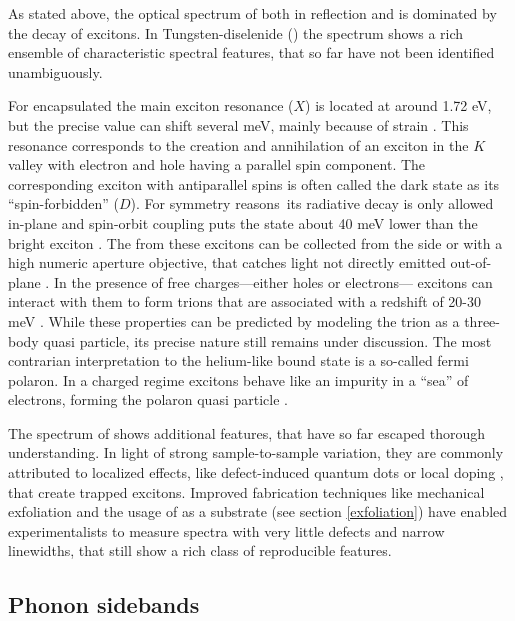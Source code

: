 As stated above, the optical spectrum of \tmds both in reflection and \pl is dominated by the decay of excitons. In Tungsten-diselenide (\wse\!) the \pl spectrum shows a rich ensemble of characteristic spectral features, that so far have not been identified unambiguously. 

For \hbng encapsulated \wse the main exciton resonance ($X$) is located at around 1.72 eV, but the precise value can shift several meV, mainly because of strain \cite{zhu_strain_2013}. This resonance corresponds to the creation and annihilation of an exciton in the $K$ valley with electron and hole having a parallel spin component. The corresponding exciton with antiparallel spins is often called the dark state as its ``spin-forbidden'' ($D$). For symmetry reasons\textregistered\ its radiative decay is only allowed in-plane and spin-orbit coupling puts the state about 40 meV lower than the bright exciton \cite{echeverry_splitting_2016}. The \pl from these excitons can be collected from the side or with a high numeric aperture objective, that catches light not directly emitted out-of-plane \cite{robert_fine_2017, wang_-plane_2017}. In the presence of free charges---either holes or electrons--- excitons can interact with them to form trions that are associated with a redshift of 20-30 meV \cite{courtade_charged_2017}. While these properties can be predicted by modeling the trion as a three-body quasi particle, its precise nature still remains under discussion. The most contrarian interpretation to the helium-like bound state is a so-called fermi polaron. In a charged regime excitons behave like an impurity in a ``sea'' of electrons, forming the polaron quasi particle \cite{sidler_fermi_2016, efimkin_many-body_2017,schmidt_fermi_2012}.

The spectrum of \wse shows additional features, that have so far escaped thorough understanding. In light of strong sample-to-sample variation, they are commonly attributed to localized effects, like defect-induced quantum dots or local doping \cite{kato_optical_2014, zhang_defect_2017}, that create trapped excitons. Improved fabrication techniques like mechanical exfoliation and the usage of \hbng as a substrate (see section \ref{exfoliation}) have enabled experimentalists to measure spectra with very little defects and narrow linewidths, that still show a rich class of reproducible features.

\subsection{Phonon sidebands}\label{sidebands}

